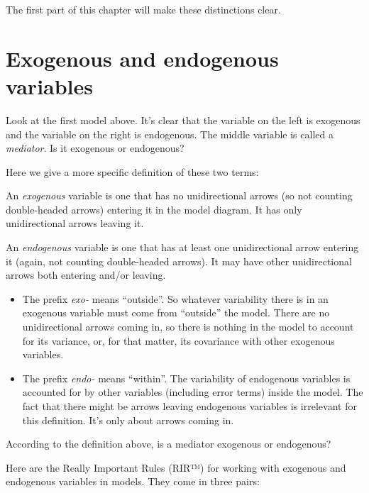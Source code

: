 \documentclass[
]{book}
\begin{document}
The first part of this chapter will make these distinctions clear.

\hypertarget{mediation-exogenous-endogenous}{%
\section{Exogenous and endogenous variables}\label{mediation-exogenous-endogenous}}

Look at the first model above. It's clear that the variable on the left is exogenous and the variable on the right is endogenous. The middle variable is called a \emph{mediator}. Is it exogenous or endogenous?

Here we give a more specific definition of these two terms:

An \emph{exogenous} variable is one that has no unidirectional arrows (so not counting double-headed arrows) entering it in the model diagram. It has only unidirectional arrows leaving it.

An \emph{endogenous} variable is one that has at least one unidirectional arrow entering it (again, not counting double-headed arrows). It may have other unidirectional arrows both entering and/or leaving.

\begin{itemize}
\item
  The prefix \emph{exo-} means ``outside''. So whatever variability there is in an exogenous variable must come from ``outside'' the model. There are no unidirectional arrows coming in, so there is nothing in the model to account for its variance, or, for that matter, its covariance with other exogenous variables.
\item
  The prefix \emph{endo-} means ``within''. The variability of endogenous variables is accounted for by other variables (including error terms) inside the model. The fact that there might be arrows leaving endogenous variables is irrelevant for this definition. It's only about arrows coming in.
\end{itemize}

According to the definition above, is a mediator exogenous or endogenous?

Here are the Really Important Rules (RIR™) for working with exogenous and endogenous variables in models. They come in three pairs:
\end{document}
